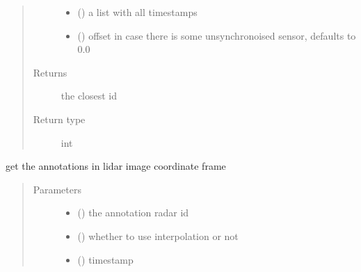 \documentclass[letterpaper,10pt,english]{sphinxmanual}
\begin{document}
\begin{fulllineitems}
\begin{fulllineitems}
\begin{quote}
\begin{description}
\begin{itemize}
\item {} 
 () \textendash{} a list with all timestamps

\item {} 
 (\sphinxstyleliteralemphasis{\sphinxupquote{, }}) \textendash{} offset in case there is some unsynchronoised sensor, defaults to 0.0

\end{itemize}

\item[{Returns}] \leavevmode
the closest id

\item[{Return type}] \leavevmode
int

\end{description}\end{quote}

\end{fulllineitems}


\begin{fulllineitems}
\label{\detokenize{radiate:radiate.Sequence.get_lidar_annotations}}
get the annotations in lidar image coordinate frame
\begin{quote}\begin{description}
\item[{Parameters}] \leavevmode\begin{itemize}
\item {} 
 () \textendash{} the annotation radar id

\item {} 
 () \textendash{} whether to use interpolation or not

\item {} 
 () \textendash{} timestamp


\end{itemize}
\end{description}
\end{quote}
\end{fulllineitems}
\end{fulllineitems}
\end{document}
